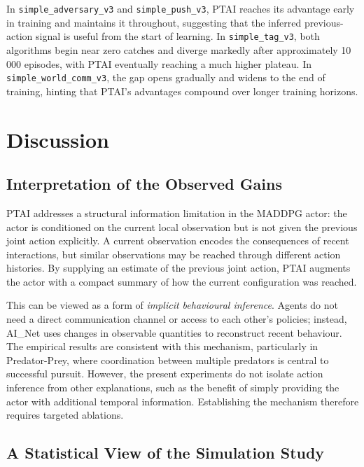 \documentclass[12pt]{article}
\begin{document}
In \texttt{simple\_adversary\_v3} and \texttt{simple\_push\_v3}, PTAI reaches its
advantage early in training and maintains it throughout, suggesting that the inferred
previous-action signal is useful from the start of learning. In \texttt{simple\_tag\_v3},
both algorithms begin near zero catches and diverge markedly after approximately 10\,000
episodes, with PTAI eventually reaching a much higher plateau. In
\texttt{simple\_world\_comm\_v3}, the gap opens gradually and widens to the end of
training, hinting that PTAI's advantages compound over longer training horizons.

\section{Discussion}

\subsection{Interpretation of the Observed Gains}

PTAI addresses a structural information limitation in the MADDPG actor: the actor is
conditioned on the current local observation but is not given the previous joint action
explicitly. A current observation encodes the consequences of recent interactions, but
similar observations may be reached through different action histories. By supplying an
estimate of the previous joint action, PTAI augments the actor with a compact summary of
how the current configuration was reached.

This can be viewed as a form of \emph{implicit behavioural inference}. Agents do not need
a direct communication channel or access to each other's policies; instead, AI\_Net uses
changes in observable quantities to reconstruct recent behaviour. The empirical results
are consistent with this mechanism, particularly in Predator-Prey, where coordination
between multiple predators is central to successful pursuit. However, the present
experiments do not isolate action inference from other explanations, such as the benefit
of simply providing the actor with additional temporal information. Establishing the
mechanism therefore requires targeted ablations.

\subsection{A Statistical View of the Simulation Study}
\end{document}
